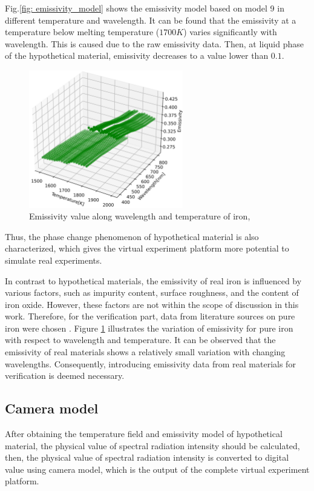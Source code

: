 Fig.\ref{fig: emissivity_model} shows the emissivity model based 
on model 9 in different temperature 
and wavelength. It can be found that the emissivity at a temperature 
below melting temperature ($1700K$) varies significantly with wavelength.
This is caused due to the raw emissivity data. Then, at liquid phase of 
the hypothetical material, emissivity decreases to a value lower than $0.1$.


\begin{figure}[htbp]
  \centering
  \includegraphics[width=0.6\textwidth]{figures/emissivity_model_iron.jpg}
  \caption{Emissivity value along wavelength and temperature of iron\cite{Kobatake.2012}, \cite{Watanabe.2003}}
  \label{fig: emissivity_iron}
\end{figure}

Thus, the phase change phenomenon of hypothetical material is also characterized, 
which gives the virtual experiment platform more potential to simulate 
real experiments.


In contrast to hypothetical materials, the emissivity of real iron is 
influenced by various factors, such as impurity content, surface 
roughness, and the content of iron oxide. However, these factors 
are not within the scope of discussion in this work. Therefore, for 
the verification part, data from literature sources on pure iron were 
chosen \cite{Kobatake.2012, Watanabe.2003}. 
Figure \ref{fig: emissivity_iron} illustrates the variation of 
emissivity for pure iron with respect to wavelength and temperature. 
It can be observed that the emissivity of real materials shows a 
relatively small variation with changing wavelengths. Consequently, 
introducing emissivity data from real materials for verification is 
deemed necessary.





\subsection{Camera model}
After obtaining the temperature field and emissivity model of hypothetical material, 
the physical value of spectral radiation intensity should be calculated, then, 
the physical value of spectral radiation intensity is converted to 
digital value using camera model, which is the output of the complete virtual 
experiment platform. 


